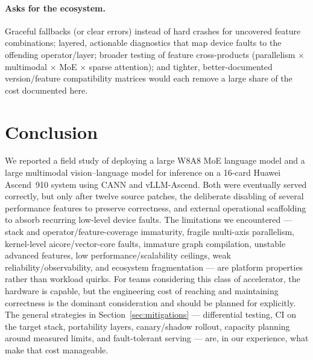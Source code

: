 \documentclass{article}
\begin{document}
\paragraph{Asks for the ecosystem.} Graceful fallbacks (or clear errors) instead
of hard crashes for uncovered feature combinations; layered, actionable
diagnostics that map device faults to the offending operator/layer; broader
testing of feature cross-products (parallelism $\times$ multimodal $\times$ MoE
$\times$ sparse attention); and tighter, better-documented version/feature
compatibility matrices would each remove a large share of the cost documented
here.

\section{Conclusion}
\label{sec:conclusion}
We reported a field study of deploying a large W8A8 MoE language model and a large
multimodal vision--language model for inference on a 16-card Huawei Ascend~910
system using CANN and vLLM-Ascend. Both were eventually served correctly, but only
after twelve source patches, the deliberate disabling of several performance
features to preserve correctness, and external operational scaffolding to absorb
recurring low-level device faults. The limitations we encountered --- stack and
operator/feature-coverage immaturity, fragile multi-axis parallelism, kernel-level
aicore/vector-core faults, immature graph compilation, unstable advanced features,
low performance/scalability ceilings, weak reliability/observability, and ecosystem
fragmentation --- are platform properties rather than workload quirks. For teams
considering this class of accelerator, the hardware is capable, but the engineering
cost of reaching and maintaining correctness is the dominant consideration and
should be planned for explicitly. The general strategies in
Section~\ref{sec:mitigations} --- differential testing, CI on the target stack,
portability layers, canary/shadow rollout, capacity planning around measured
limits, and fault-tolerant serving --- are, in our experience, what make that cost
manageable.



\end{document}
